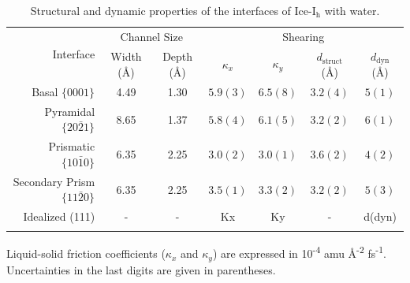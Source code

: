 \documentclass[aps,jcp,preprint,showpacs,superscriptaddress,groupedaddress]{revtex4}  %
\begin{document}
\newpage
\begin{table}[h]
\centering
\caption{Structural and dynamic properties of the interfaces of
  Ice-I$_\mathrm{h}$ with water.\label{tab:kappa}}
\begin{tabular}{r|cc|cccc}  
\toprule
\multirow{2}{*}{Interface} & \multicolumn{2}{c|}{Channel Size} & \multicolumn{4}{c}{Shearing\footnotemark[1]}\\
  & Width (\AA) & Depth (\AA) &
$\kappa_{x}$  & $\kappa_{y}$ & $d_\mathrm{struct}$ (\AA) &  $d_\mathrm{dyn}$ (\AA) \\ 
\colrule
Basal  $\{0001\}$                 & 4.49 & 1.30 & $5.9(3)$ & $6.5(8)$ & $3.2(4)$ & $5(1)$  \\
Pyramidal  $\{20\bar{2}1\}$       & 8.65 & 1.37 &
$5.8(4)$ & $6.1(5)$ & $3.2(2)$ & $6(1)$\\
Prismatic  $\{10\bar{1}0\}$       & 6.35 & 2.25 &
$3.0(2)$ & $3.0(1)$ & $3.6(2)$ & $4(2)$ \\
Secondary Prism  $\{11\bar{2}0\}$ & 6.35 & 2.25 &
$3.5(1)$ & $3.3(2)$ & $3.2(2)$ & $5(3)$ \\ 
Idealized (111)                   &  -  &  -  & Kx & Ky & - & d(dyn) \\
\botrule
\end{tabular}
\begin{flushleft}
\footnotemark[1]\footnotesize{Liquid-solid friction coefficients ($\kappa_x$ and
  $\kappa_y$) are expressed in 10\textsuperscript{-4} amu
  \AA\textsuperscript{-2} fs\textsuperscript{-1}.} \\
\footnotemark[2]\footnotesize{Uncertainties in
  the last digits are given in parentheses.} 
\end{flushleft}
\end{table}
\end{document}
